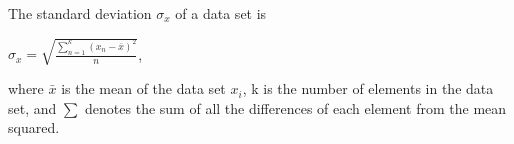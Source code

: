 The standard deviation $ \sigma_x $ of a data set is

$ \sigma_x = \sqrt{\frac{\sum_{n = 1}^{k}(x_n - \bar{x})^2}{n}}$,

where $ \bar{x} $ is the mean of the data set $ x_i $, k is the number of elements in the data set, and $ \sum $ denotes the sum of all the differences of each element from the mean squared.  